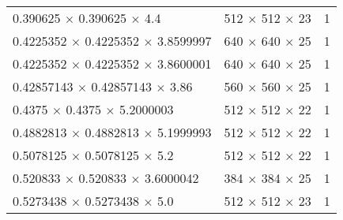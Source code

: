 \begin{table}[H]
\begin{tabularx}{\textwidth}{X X r}
    \num{0.390625} $ \times $ \num{0.390625} $ \times $ \num{4.4}            &   \num[minimum-decimal-digits=0,drop-zero-decimal]{512} $ \times $ \num[minimum-decimal-digits=0,drop-zero-decimal]{512} $ \times $ \num[minimum-decimal-digits=0,drop-zero-decimal]{23}  & 1\\
    \num{0.4225352} $ \times $ \num{0.4225352} $ \times $ \num{3.8599997}    &   \num[minimum-decimal-digits=0,drop-zero-decimal]{640} $ \times $ \num[minimum-decimal-digits=0,drop-zero-decimal]{640} $ \times $ \num[minimum-decimal-digits=0,drop-zero-decimal]{25}  & 1\\
    \num{0.4225352} $ \times $ \num{0.4225352} $ \times $ \num{3.8600001}    &   \num[minimum-decimal-digits=0,drop-zero-decimal]{640} $ \times $ \num[minimum-decimal-digits=0,drop-zero-decimal]{640} $ \times $ \num[minimum-decimal-digits=0,drop-zero-decimal]{25}  & 1\\
    \num{0.42857143} $ \times $ \num{0.42857143} $ \times $ \num{3.86}       &   \num[minimum-decimal-digits=0,drop-zero-decimal]{560} $ \times $ \num[minimum-decimal-digits=0,drop-zero-decimal]{560} $ \times $ \num[minimum-decimal-digits=0,drop-zero-decimal]{25}  & 1\\
    \num{0.4375} $ \times $ \num{0.4375} $ \times $ \num{5.2000003}          &   \num[minimum-decimal-digits=0,drop-zero-decimal]{512} $ \times $ \num[minimum-decimal-digits=0,drop-zero-decimal]{512} $ \times $ \num[minimum-decimal-digits=0,drop-zero-decimal]{22}  & 1\\
    \num{0.4882813} $ \times $ \num{0.4882813} $ \times $ \num{5.1999993}    &   \num[minimum-decimal-digits=0,drop-zero-decimal]{512} $ \times $ \num[minimum-decimal-digits=0,drop-zero-decimal]{512} $ \times $ \num[minimum-decimal-digits=0,drop-zero-decimal]{22}  & 1\\
    \num{0.5078125} $ \times $ \num{0.5078125} $ \times $ \num{5.2}          &   \num[minimum-decimal-digits=0,drop-zero-decimal]{512} $ \times $ \num[minimum-decimal-digits=0,drop-zero-decimal]{512} $ \times $ \num[minimum-decimal-digits=0,drop-zero-decimal]{22}  & 1\\
    \num{0.520833} $ \times $ \num{0.520833} $ \times $ \num{3.6000042}      &   \num[minimum-decimal-digits=0,drop-zero-decimal]{384} $ \times $ \num[minimum-decimal-digits=0,drop-zero-decimal]{384} $ \times $ \num[minimum-decimal-digits=0,drop-zero-decimal]{25}  & 1\\
    \num{0.5273438} $ \times $ \num{0.5273438} $ \times $ \num{5.0}          &   \num[minimum-decimal-digits=0,drop-zero-decimal]{512} $ \times $ \num[minimum-decimal-digits=0,drop-zero-decimal]{512} $ \times $ \num[minimum-decimal-digits=0,drop-zero-decimal]{23}  & 1\\

\end{tabularx}
\end{table}
